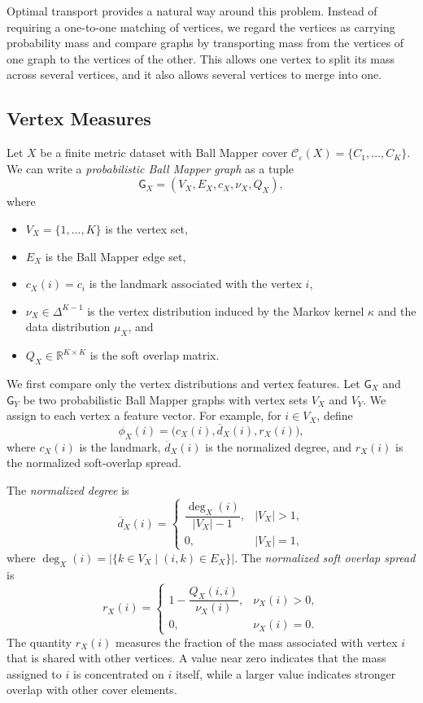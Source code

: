\documentclass[9pt,a4paper,twocolumn,twoside]{extarticle}
\theoremstyle{definition}
\begin{document}
Optimal transport \cite{villani2009optimal} provides a natural way around this problem. Instead of requiring a one-to-one matching of vertices, we regard the vertices as carrying probability mass and compare graphs by transporting mass from the vertices of one graph to the vertices of the other. This allows one vertex to split its mass across several vertices, and it also allows several vertices to merge into one.

\subsection{Vertex Measures}

Let $X$ be a finite metric dataset with Ball Mapper cover $\mathcal C_\varepsilon(X) = \{C_1,\dots,C_K\}$. We can write a \emph{probabilistic Ball Mapper graph} as a tuple
\[
\mathsf G_X=(V_X,E_X,c_X,\nu_X,Q_X),
\]
where
\begin{itemize}
\item $V_X = \{1,\dots,K\}$ is the vertex set,
\item $E_X$ is the Ball Mapper edge set,
\item $c_X(i)=c_i$ is the landmark associated with the vertex $i$,
\item $\nu_X\in\Delta^{K-1}$ is the vertex distribution induced by the Markov kernel $\kappa$ and the data distribution $\mu_X$, and
\item $Q_X\in\mathbb R^{K\times K}$ is the soft overlap matrix.
\end{itemize}

We first compare only the vertex distributions and vertex features. Let $\mathsf G_X$ and $\mathsf G_Y$ be two probabilistic Ball Mapper graphs with vertex sets $V_X$ and $V_Y$. We assign to each vertex a feature vector. For example, for $i\in V_X$, define
\[
\phi_X(i) =\bigl(c_X(i),\overline d_X(i),r_X(i)\bigr),
\]
where $c_X(i)$ is the landmark, $\overline d_X(i)$ is the normalized degree, and $r_X(i)$ is the normalized soft-overlap spread.

The \emph{normalized degree} is
\[
\overline d_X(i) =
\begin{cases}
\dfrac{\deg_X(i)}{|V_X|-1}, & |V_X|>1,\\[0.5em]
0, & |V_X|=1,
\end{cases}
\]
where $\deg_X(i) = \left|\{k\in V_X \mid (i,k)\in E_X\}\right|$. The \emph{normalized soft overlap spread} is
\[
r_X(i) =
\begin{cases}
1-\dfrac{Q_X(i,i)}{\nu_X(i)}, & \nu_X(i)>0,\\[0.3em]
0, & \nu_X(i)=0.
\end{cases}
\]
The quantity $r_X(i)$ measures the fraction of the mass associated with vertex $i$ that is shared with other vertices. A value near zero indicates that the mass assigned to $i$ is concentrated on $i$ itself, while a larger value indicates stronger overlap with other cover elements.
\end{document}
